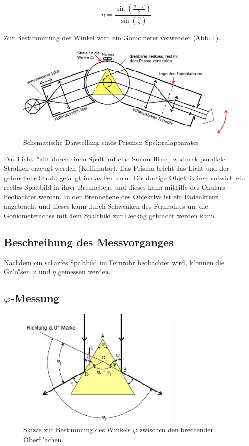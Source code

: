 	\begin{equation}
		n = \frac{\sin(\frac{\eta+\varphi}{2})}{\sin(\frac{\varphi}{2})} \label{eqn:brechungsindex}
	\end{equation}

	Zur Bestimmmung der Winkel wird ein Goniometer verwendet (Abb. \ref{gonio}).

	\begin{figure}[!h]
		\centering
		\includegraphics[width = 12cm]{img/gonio.JPG}
		\caption{Schematische Darstellung eines Prismen-Spektralapparates \cite{anleitung}}
		\label{gonio}
	\end{figure}

	Das Licht f"allt durch einen Spalt auf eine Sammellinse, wodurch parallele Strahlen erzeugt werden (Kollimator).
	Das Prisma bricht das Licht und der gebrochene Strahl gelangt in das Fernrohr. Die dortige Objektivlinse entwirft ein reelles Spaltbild in ihrer Brennebene und dieses kann mithilfe des Okulars beobachtet werden.
	In der Brennebene des Objektivs ist ein Fadenkreuz angebracht und dieses kann durch Schwenken des Fernrohres um die Goniometerachse mit dem Spaltbild zur Deckng gebracht werden kann.

	\subsection{Beschreibung des Messvorganges} %
	\label{sub:beschreibung_des_messvorganges}
	
	Nachdem ein scharfes Spaltbild im Fernrohr beobachtet wird, k"onnen die Gr"o"sen $\varphi$ und $\eta$ gemessen werden.

	\subsection{$\varphi$-Messung} %
	\label{sub:varphi_}
	
	\begin{figure}[!h]
		\centering
		\includegraphics[width = 8cm]{img/phi.JPG}
		\caption{Skizze zur Bestimmung des Winkels $\varphi$ zwischen den brechenden Oberfl"achen. \cite{anleitung}}
		\label{fg:phi}
	\end{figure}

